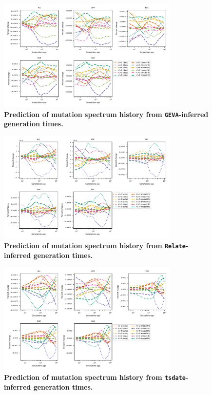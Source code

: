 \documentclass[]{article}
\begin{document}
\begin{figure}[ht!]
    \centering
    \includegraphics[width=0.8\textwidth]{../plots/goodness-of-fit.geva.pdf}
    \caption{
        \textbf{Prediction of mutation spectrum history from
        \texttt{GEVA}-inferred generation times.}
    }
    \label{fig:geva-fit}
\end{figure}


\begin{figure}[ht!]
    \centering
    \includegraphics[width=0.8\textwidth]{../plots/goodness-of-fit.relate.pdf}
    \caption{
        \textbf{Prediction of mutation spectrum history from
        \texttt{Relate}-inferred generation times.}
    }
    \label{fig:relate-fit}
\end{figure}


\begin{figure}[ht!]
    \centering
    \includegraphics[width=0.8\textwidth]{../plots/goodness-of-fit.tsdate.pdf}
    \caption{
        \textbf{Prediction of mutation spectrum history from
        \texttt{tsdate}-inferred generation times.}
    }
    \label{fig:tsdate-fit}
\end{figure}
\end{document}
